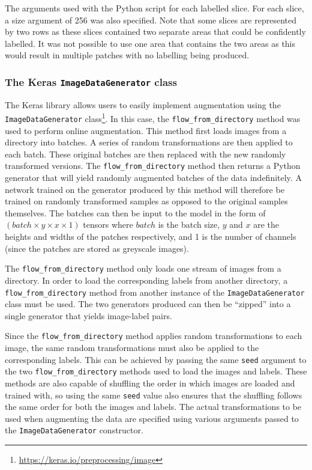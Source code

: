 \begin{table}[!t]
\centering
\caption{The arguments used with the Python script for each labelled slice. For each slice, a size argument of 256 was also specified. Note that some slices are represented by two rows as these slices contained two separate areas that could be confidently labelled. It was not possible to use one area that contains the two areas as this would result in multiple patches with no labelling being produced.}

\label{tab:slidingwindow}
\end{table}

\subsubsection{The Keras \texttt{ImageDataGenerator} class}

The Keras library allows users to easily implement augmentation using the \texttt{ImageDataGenerator} class\footnote{\url{https://keras.io/preprocessing/image}}. In this case, the \texttt{flow\_from\_directory} method was used to perform online augmentation. This method first loads images from a directory into batches. A series of random transformations are then applied to each batch. These original batches are then replaced with the new randomly transformed versions. The \texttt{flow\_from\_directory} method then returns a Python generator that will yield randomly augmented batches of the data indefinitely. A network trained on the generator produced by this method will therefore be trained on randomly transformed samples as opposed to the original samples themselves. The batches can then be input to the model in the form of $(batch \times y \times x \times 1)$ tensors where $batch$ is the batch size, $y$ and $x$ are the heights and widths of the patches respectively, and 1 is the number of channels (since the patches are stored as greyscale images).

The \texttt{flow\_from\_directory} method only loads one stream of images from a directory. In order to load the corresponding labels from another directory, a \texttt{flow\_from\_directory} method from another instance of the \texttt{ImageDataGenerator} class must be used. The two generators produced can then be ``zipped'' into a single generator that yields image-label pairs.

Since the \texttt{flow\_from\_directory} method applies random transformations to each image, the same random transformations must also be applied to the corresponding labels. This can be achieved by passing the same \texttt{seed} argument to the two \texttt{flow\_from\_directory} methods used to load the images and labels. These methods are also capable of shuffling the order in which images are loaded and trained with, so using the same \texttt{seed} value also ensures that the shuffling follows the same order for both the images and labels. The actual transformations to be used when augmenting the data are specified using various arguments passed to the \texttt{ImageDataGenerator} constructor.

